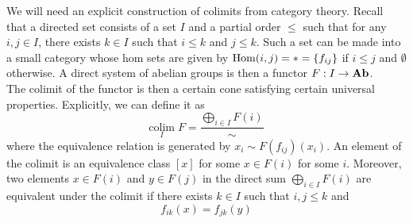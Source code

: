 \documentclass[a4paper]{article}
\begin{document}
We will need an explicit construction of colimits from category theory. Recall that a directed set consists of a set $I$ and a partial order $\leq$ such that for any $i,j\in I$, there exists $k\in I$ such that $i\leq k$ and $j\leq k$. Such a set can be made into a small category whose hom sets are given by $\operatorname{Hom}(i,j)=\ast=\{f_{ij}\}$ if $i\leq j$ and $\emptyset$ otherwise. A direct system of abelian groups is then a functor $F:I\to\bold{Ab}$. \\

The colimit of the functor is then a certain cone satisfying certain universal properties. Explicitly, we can define it as $$\underset{I}{\text{colim}}\;F=\frac{\bigoplus_{i\in I}F(i)}{\sim}$$ where the equivalence relation is generated by $x_i\sim F(f_{ij})(x_i)$. An element of the colimit is an equivalence class $[x]$ for some $x\in F(i)$ for some $i$. Moreover, two elements $x\in F(i)$ and $y\in F(j)$ in the direct sum $\bigoplus_{i\in I}F(i)$ are equivalent under the colimit if there exists $k\in I$ such that $i,j\leq k$ and $$f_{ik}(x)=f_{jk}(y)$$
\end{document}

